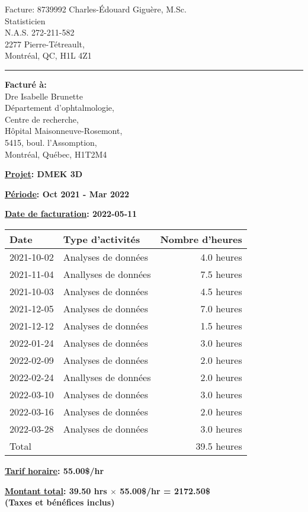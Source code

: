 \documentclass{facture} %
\def \tab {\hspace*{3ex}} %
\begin{document}
Facture: 8739992 \hfill Charles-Édouard Giguère, M.Sc. \\
\null \hfill Statisticien \\
\null \hfill N.A.S. 272-211-582 \\
\null \hfill 2277 Pierre-Tétreault,\\
\null \hfill Montréal, QC, H1L 4Z1 \\
\hrule height 2 pt \relax %

\bigskip
\bigskip

\textbf{ Facturé à:} \\
\tab Dre Isabelle Brunette \\
\tab Département d'ophtalmologie, \\
\tab Centre de recherche, \\
\tab Hôpital Maisonneuve-Rosemont, \\
\tab 5415, boul. l'Assomption, \\
\tab Montréal, Québec, H1T2M4 \\

\bigskip
\bigskip

\textbf{\underline{Projet}: DMEK 3D}

\bigskip
    
\textbf{\underline{Période}: Oct 2021 - Mar 2022} 

\bigskip

\textbf{\underline{Date de facturation}: 2022-05-11} 

\bigskip
\bigskip
\bigskip


\begin{center}
  \begin{tabular}[htp!]{l l r}
    \hline
    \textbf{Date} & \textbf{Type d'activités} & \textbf{Nombre d'heures} \\
    \hline \hline
    2021-10-02 & Analyses de données & 4.0 heures\\
2021-11-04 & Anallyses de données & 7.5 heures\\
2021-10-03 & Analyses de données & 4.5 heures\\
2021-12-05 & Analyses de données & 7.0 heures\\
2021-12-12 & Analyses de données & 1.5 heures\\
2022-01-24 & Analyses de données & 3.0 heures\\
2022-02-09 & Analyses de données & 2.0 heures\\
2022-02-24 & Anallyses de données & 2.0 heures\\
2022-03-10 & Analyses de données & 3.0 heures\\
2022-03-16 & Analyses de données & 2.0 heures\\
2022-03-28 & Analyses de données & 3.0 heures\\
\hline
Total   & & 39.5 heures \\
\hline
    
  \end{tabular}
\end{center}

\bigskip

\textbf{\underline{Tarif horaire}: 55.00\$/hr}

\bigskip

\textbf{\underline{Montant total}: 39.50 hrs  $\times$ 55.00\$/hr
  = 2172.50\$} \\
\textbf{(Taxes et bénéfices inclus)}
\end{document}
